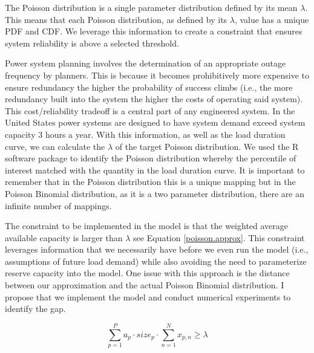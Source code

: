 \documentclass[10pt]{amsart}
\begin{document}
The Poisson distribution is a single parameter distribution defined by its mean $\lambda$. 
This means that each Poisson distribution, as defined by its $\lambda$, value has a unique PDF and CDF. 
We leverage this information to create a constraint that ensures system reliability is above a selected threshold. 

Power system planning involves the determination of an appropriate outage frequency by planners.
This is because it becomes prohibitively more expensive to ensure redundancy the higher the probability of success climbs (i.e., the more redundancy built into the system the higher the costs of operating said system).
This cost/reliability tradeoff is a central part of any engineered system.
In the United States power systems are designed to have system demand exceed system capacity 3 hours a year.
With this information, as well as the load duration curve, we can calculate the $\lambda$ of the target Poisson distribution.
We used the R software package to identify the Poisson distribution whereby the percentile of interest matched with the quantity in the load duration curve.
It is important to remember that in the Poisson distribution this is a unique mapping but in the Poisson Binomial distribution, as it is a two parameter distribution, there are an infinite number of mappings.

The constraint to be implemented in the model is that the weighted average available capacity is larger than $\lambda$ see Equation \ref{poisson.approx}.
This constraint leverages information that we necessarily have before we even run the model (i.e., assumptions of future load demand) while also avoiding the need to parameterize reserve capacity into the model. 
One issue with this approach is the distance between our approximation and the actual Poisson Binomial distribution.
I propose that we implement the model and conduct numerical experiments to identify the gap.

\begin{equation}\label{poisson.approx}
\sum_{p=1}^{P} a_{p} \cdot size_{p} \cdot \sum_{n=1}^{N} x_{p,n} \geq \lambda
\end{equation}
\end{document}
